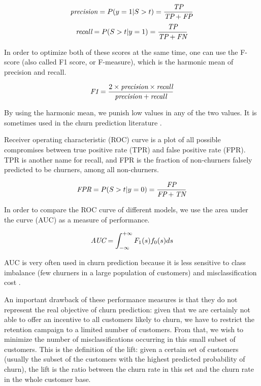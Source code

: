 \begin{equation*}
    \textit{precision} = P(y=1|S>t) = \frac{\textit{TP}}{\textit{TP} + \textit{FP}}
\end{equation*}
\begin{equation*}
    \textit{recall}    = P(S>t|y=1) = \frac{\textit{TP}}{\textit{TP} + \textit{FN}}
\end{equation*}

In order to optimize both of these scores at the same time, one can use the
F-score (also called F1 score, or F-measure), which is the harmonic mean of
precision and recall.

\[\textit{F1} = \frac{2\times \textit{precision} \times \textit{recall}}{\textit{precision} + \textit{recall}}\]

By using the harmonic mean, we punish low values in any of the two values. It is
sometimes used in the churn prediction literature \parencite{ahmed2017churn,
keramati2014improved}.

Receiver operating characteristic (ROC) curve \parencite{krzanowski2009roc} is a
plot of all possible compromises between true positive rate (TPR) and false
positive rate (FPR). TPR is another name for recall, and FPR is the fraction of
non-churners falsely predicted to be churners, among all non-churners.

\begin{equation*}
    \textit{FPR}=P(S>t|y=0)=\frac{\textit{FP}}{\textit{FP} + \textit{TN}}
\end{equation*}

In order to compare the ROC curve of different models, we use the area under the
curve (AUC) as a measure of performance.

\[\textit{AUC}=\int_{-\infty}^{+\infty}F_1(s)f_0(s)ds\]

AUC is very often used in churn prediction \parencite{coussement2017comparative,
mitrovic2018operational} because it is less sensitive to class imbalance (few
churners in a large population of customers) and misclassification cost
\parencite{verbeke2012new}.

An important drawback of these performance measures is that they do not
represent the real objective of churn prediction: given that we are
certainly not able to offer an incentive to all customers likely to
churn, we have to restrict the retention campaign to a limited number of
customers. From that, we wish to minimize the number of misclassifications
occurring in this small subset of customers. This is the definition of the lift:
given a certain set of customers (usually the subset of the customers with the
highest predicted probability of churn), the lift is the ratio between the churn
rate in this set and the churn rate in the whole customer base.

